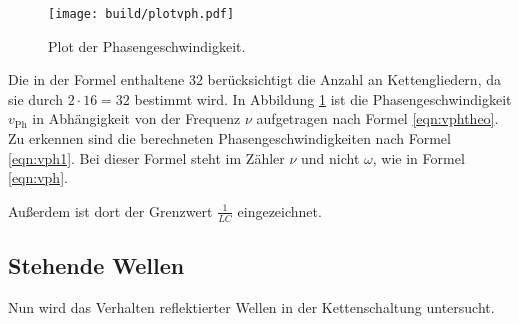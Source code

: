 \begin{figure}[h]
  \centering
  \texttt{[image: build/plotvph.pdf]}
  \caption{Plot der Phasengeschwindigkeit.}
  \label{fig:vph}
\end{figure}

Die in der Formel enthaltene $32$ berücksichtigt die Anzahl an Kettengliedern, da
sie durch $2\cdot 16=32$ bestimmt wird.
In Abbildung \ref{fig:vph} ist die Phasengeschwindigkeit $v_{\text{Ph}}$ in
Abhängigkeit von der Frequenz $\nu$ aufgetragen nach Formel \eqref{eqn:vphtheo}.
 Zu erkennen sind die berechneten
Phasengeschwindigkeiten nach Formel \eqref{eqn:vph1}. Bei dieser Formel steht im
Zähler $\nu$ und nicht $\omega$, wie in Formel \eqref{eqn:vph}.

Außerdem ist dort der Grenzwert $\frac{1}{LC}$ eingezeichnet.
\subsection{Stehende Wellen}

Nun wird das Verhalten reflektierter Wellen in der Kettenschaltung
untersucht.


